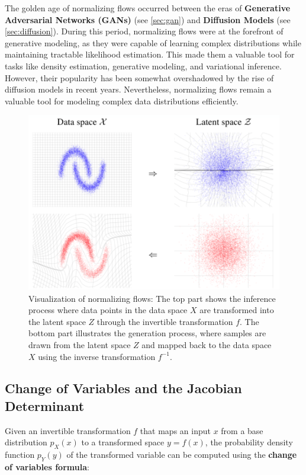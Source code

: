 \documentclass{article}
\begin{document}
The golden age of normalizing flows occurred between the eras of \textbf{Generative Adversarial Networks (GANs)} (see \ref{sec:gan}) and \textbf{Diffusion Models} (see \ref{sec:diffusion}). During this period, normalizing flows were at the forefront of generative modeling, as they were capable of learning complex distributions while maintaining tractable likelihood estimation. This made them a valuable tool for tasks like density estimation, generative modeling, and variational inference. However, their popularity has been somewhat overshadowed by the rise of diffusion models in recent years. Nevertheless, normalizing flows remain a valuable tool for modeling complex data distributions efficiently.

\begin{figure}[ht]
    \centering
    \includegraphics[width=0.75\linewidth]{graphics/S9Flows/space_transformations.png}
    \caption{Visualization of normalizing flows: The top part shows the inference process where data points in the data space \(X\) are transformed into the latent space \(Z\) through the invertible transformation \(f\). The bottom part illustrates the generation process, where samples are drawn from the latent space \(Z\) and mapped back to the data space \(X\) using the inverse transformation \(f^{-1}\).}
    \label{fig:space-transformations}
\end{figure}

\subsection{Change of Variables and the Jacobian Determinant}
Given an invertible transformation \( f \) that maps an input \( x \) from a base distribution \( p_X(x) \) to a transformed space \( y = f(x) \), the probability density function \( p_Y(y) \) of the transformed variable can be computed using the \textbf{change of variables formula}:
\end{document}
